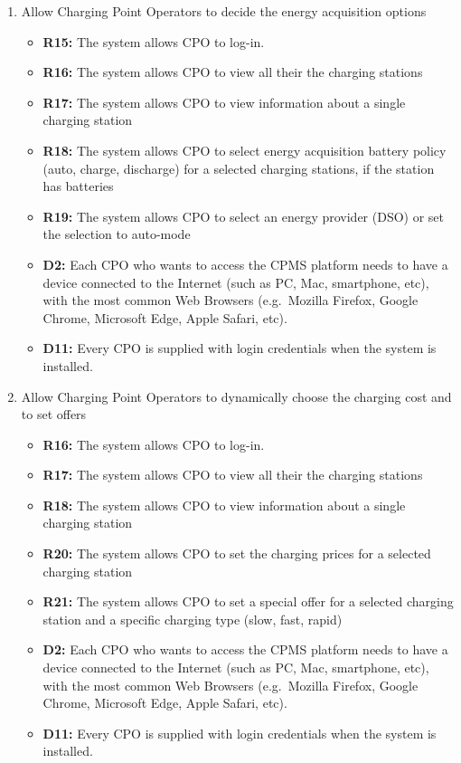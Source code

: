 \begin{enumerate}[label=\textbf{-G\arabic*}:]
          \item {Allow Charging Point Operators to decide the energy acquisition options
          \begin{itemize}
              \item \textbf{R15:} The system allows CPO to log-in.
              \item \textbf{R16:} The system allows CPO to view all their the charging stations 
              \item \textbf{R17:} The system allows CPO to view information about a single charging station
              \item \textbf{R18:} The system allows CPO to select energy acquisition battery policy (auto, charge, discharge) for a selected charging stations, if the station has batteries
              \item \textbf{R19:} The system allows CPO to select an energy provider (DSO) or set the selection to auto-mode 
              \item \textbf{D2:} Each CPO who wants to access the CPMS platform needs to have a device connected to the Internet (such as PC, Mac, smartphone, etc), with the most common Web Browsers (e.g.\ Mozilla Firefox, Google Chrome, Microsoft Edge, Apple Safari, etc).
              \item \textbf{D11:} Every CPO is supplied with login credentials when the system is installed.              
          \end{itemize}
          }


          \item {Allow Charging Point Operators to dynamically choose the charging cost and to set offers
          \begin{itemize}
            \item \textbf{R16:} The system allows CPO to log-in.
            \item \textbf{R17:} The system allows CPO to view all their the charging stations 
            \item \textbf{R18:} The system allows CPO to view information about a single charging station
            \item \textbf{R20:} The system allows CPO to set the charging prices for a selected charging station
            \item \textbf{R21:} The system allows CPO to set a special offer for a selected charging station and a specific charging type (slow, fast, rapid)
            \item \textbf{D2:} Each CPO who wants to access the CPMS platform needs to have a device connected to the Internet (such as PC, Mac, smartphone, etc), with the most common Web Browsers (e.g.\ Mozilla Firefox, Google Chrome, Microsoft Edge, Apple Safari, etc).
            \item \textbf{D11:} Every CPO is supplied with login credentials when the system is installed.              
          \end{itemize}
          }
\end{enumerate}

